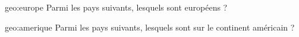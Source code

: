 \documentclass[a4paper]{article}
\begin{document}
{\begin{questionmult}{geo:europe}
  Parmi les pays suivants, lesquels sont européens ?
  \begin{reponses}
  \end{reponses}
\end{questionmult}

\begin{questionmult}{geo:amerique}
  Parmi les pays suivants, lesquels sont sur le continent américain ?
  \begin{reponses}
  \end{reponses}
\end{questionmult}

}   
\end{document}
